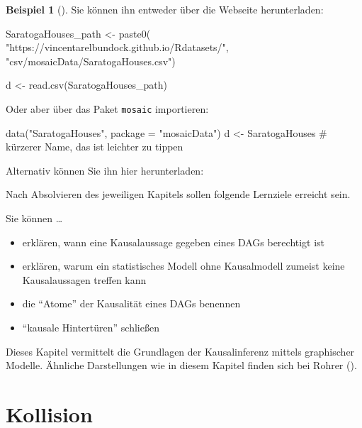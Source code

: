 \documentclass[
  ngerman,
  letterpaper,
  twoside,
  open=any]{scrbook}
\newenvironment{Shaded}{\begin{snugshade}}{\end{snugshade}}
\newcommand{\AttributeTok}[1]{\textcolor[rgb]{0.40,0.45,0.13}{#1}}
\newcommand{\CommentTok}[1]{\textcolor[rgb]{0.37,0.37,0.37}{#1}}
\newcommand{\FunctionTok}[1]{\textcolor[rgb]{0.28,0.35,0.67}{#1}}
\newcommand{\NormalTok}[1]{\textcolor[rgb]{0.00,0.23,0.31}{#1}}
\newcommand{\OtherTok}[1]{\textcolor[rgb]{0.00,0.23,0.31}{#1}}
\newcommand{\StringTok}[1]{\textcolor[rgb]{0.13,0.47,0.30}{#1}}
\providecommand{\tightlist}{%
  \setlength{\itemsep}{0pt}\setlength{\parskip}{0pt}}\usepackage{longtable,booktabs,array}
\theoremstyle{definition}
\newtheorem{example}{Beispiel}[chapter]
\theoremstyle{plain}
\theoremstyle{definition}
\theoremstyle{definition}
\theoremstyle{remark}
\begin{document}
\begin{example}[]
Sie können ihn entweder über die Webseite herunterladen:

\begin{Shaded}
\begin{Highlighting}[]
\NormalTok{SaratogaHouses\_path }\OtherTok{\textless{}{-}} \FunctionTok{paste0}\NormalTok{(}
  \StringTok{"https://vincentarelbundock.github.io/Rdatasets/"}\NormalTok{,}
  \StringTok{"csv/mosaicData/SaratogaHouses.csv"}\NormalTok{)}

\NormalTok{d }\OtherTok{\textless{}{-}} \FunctionTok{read.csv}\NormalTok{(SaratogaHouses\_path)}
\end{Highlighting}
\end{Shaded}

Oder aber über das Paket \texttt{mosaic} importieren:

\begin{Shaded}
\begin{Highlighting}[]
\FunctionTok{data}\NormalTok{(}\StringTok{"SaratogaHouses"}\NormalTok{, }\AttributeTok{package =} \StringTok{"mosaicData"}\NormalTok{)}
\NormalTok{d }\OtherTok{\textless{}{-}}\NormalTok{ SaratogaHouses  }\CommentTok{\# kürzerer Name, das ist leichter zu tippen}
\end{Highlighting}
\end{Shaded}

Alternativ können Sie ihn hier herunterladen:

Nach Absolvieren des jeweiligen Kapitels sollen folgende Lernziele
erreicht sein.

Sie können \ldots{}

\begin{itemize}
\tightlist
\item
  erklären, wann eine Kausalaussage gegeben eines DAGs berechtigt ist
\item
  erklären, warum ein statistisches Modell ohne Kausalmodell zumeist
  keine Kausalaussagen treffen kann
\item
  die ``Atome'' der Kausalität eines DAGs benennen
\item
  ``kausale Hintertüren'' schließen
\end{itemize}

Dieses Kapitel vermittelt die Grundlagen der Kausalinferenz mittels
graphischer Modelle. Ähnliche Darstellungen wie in diesem Kapitel finden
sich bei Rohrer ().

\section{Kollision}\label{kollision}


\end{example}
\end{document}

